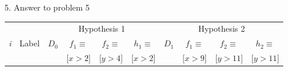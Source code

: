 \begin{enumerate}
\begin{enumerate}
\begin{itemize}
		\end{itemize}
	\end{enumerate}
\item[5.] Answer to problem 5 \\
		\begin{center}
  		\begin{tabular}{|c|c||c|c|c|c||c|c|c|c|}
      		\hline
      		& & \multicolumn{4}{c||}{Hypothesis 1}
  			& \multicolumn{4}{c|}{Hypothesis 2} \\
      		\cline{3-10}
      		{\em i} & Label & $D_0$ & $f_1 \equiv $ & $f_2 \equiv $ & $h_1\equiv$ & $D_1$ &  $f_1 \equiv $ & $f_2 \equiv $ & $h_2 \equiv $ \\
      			& & & [$x > 2$] & [$y > 4$] & [$x > 2$] & & [$x > 9$] & [$y > 11$] & [$y > 11$] \\


\end{tabular}
\end{center}
\end{enumerate}
